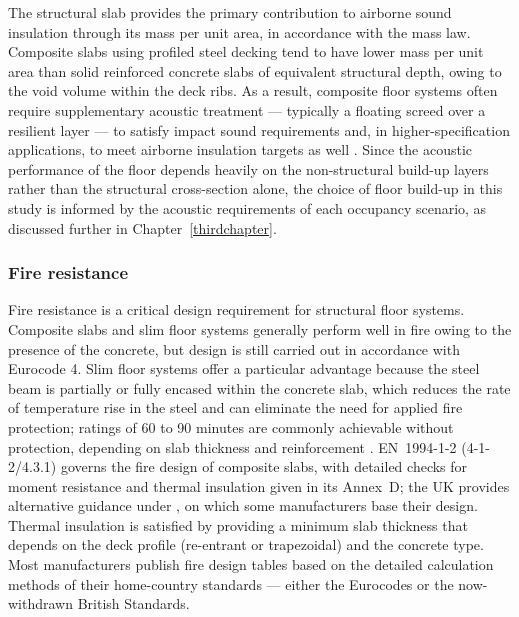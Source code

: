The structural slab provides the primary contribution to airborne sound insulation through its mass per unit area, in accordance with the mass law. Composite slabs using profiled steel decking tend to have lower mass per unit area than solid reinforced concrete slabs of equivalent structural depth, owing to the void volume within the deck ribs. As a result, composite floor systems often require supplementary acoustic treatment --- typically a floating screed over a resilient layer --- to satisfy impact sound requirements and, in higher-specification applications, to meet airborne insulation targets as well \citep{RefWorks:scip300}. Since the acoustic performance of the floor depends heavily on the non-structural build-up layers rather than the structural cross-section alone, the choice of floor build-up in this study is informed by the acoustic requirements of each occupancy scenario, as discussed further in Chapter~\ref{thirdchapter}.

\subsubsection*{Fire resistance}
Fire resistance is a critical design requirement for structural floor systems. Composite slabs and slim floor systems generally perform well in fire owing to the presence of the concrete, but design is still carried out in accordance with Eurocode 4. Slim floor systems offer a particular advantage because the steel beam is partially or fully encased within the concrete slab, which reduces the rate of temperature rise in the steel and can eliminate the need for applied fire protection; ratings of 60 to 90 minutes are commonly achievable without protection, depending on slab thickness and reinforcement \citep{RefWorks:hicks2008en}. EN~1994-1-2 (4-1-2/4.3.1) \citep{RefWorks:cen2005en} governs the fire design of composite slabs, with detailed checks for moment resistance and thermal insulation given in its Annex~D; the UK provides alternative guidance under \citet{RefWorks:francis2013ncci}, on which some manufacturers base their design. Thermal insulation is satisfied by providing a minimum slab thickness that depends on the deck profile (re-entrant or trapezoidal) and the concrete type. Most manufacturers publish fire design tables based on the detailed calculation methods of their home-country standards --- either the Eurocodes or the now-withdrawn British Standards.

